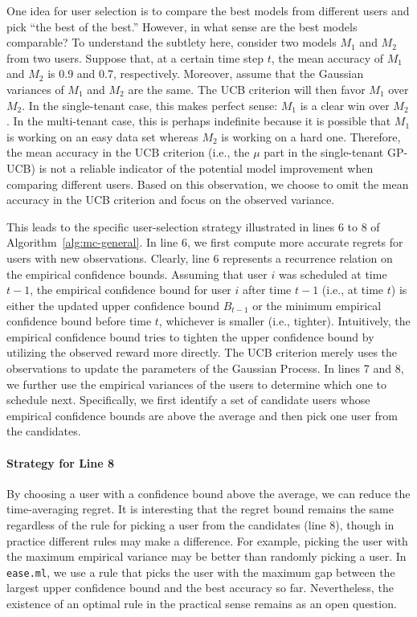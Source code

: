 \documentclass[letterpaper]{vldb}
\newcommand{\eml}{\texttt{ease.ml}\xspace}
\begin{document}
One idea for user selection is to compare the best models from different users and pick ``the best of the best.''
However, in what sense are the best models comparable?
To understand the subtlety here, consider two models $M_1$ and $M_2$ from two users.
Suppose that, at a certain time step $t$, the mean accuracy of $M_1$ and $M_2$ is 0.9 and 0.7, respectively.
Moreover, assume that the Gaussian variances of $M_1$ and $M_2$ are the same.
The UCB criterion will then favor $M_1$ over $M_2$.
In the single-tenant case, this makes perfect sense: $M_1$ is a clear win over $M_2$.
In the multi-tenant case, this is perhaps indefinite because it is possible that $M_1$ is working on an easy data set whereas $M_2$ is working on a hard one.
Therefore, the mean accuracy in the UCB criterion (i.e., the $\mu$ part in the single-tenant GP-UCB) is not a reliable indicator of the potential model improvement when comparing different users.
Based on this observation, we choose to omit the mean accuracy in the UCB criterion and focus on the observed variance.

This leads to the specific user-selection strategy illustrated in lines 6 to 8 of Algorithm~\ref{alg:mc-general}.
In line 6, we first compute more accurate regrets for users with new observations.
Clearly, line 6 represents a recurrence relation on the empirical confidence bounds.
Assuming that user $i$ was scheduled at time $t-1$, the empirical confidence bound for user $i$ after time $t-1$ (i.e., at time $t$) is either the updated upper confidence bound $B_{t-1}$
or the minimum empirical confidence bound before time $t$, whichever is smaller (i.e., tighter).
Intuitively, the empirical confidence bound tries to tighten the upper confidence bound by utilizing the observed reward more directly. The UCB criterion merely uses the observations to update the parameters of the Gaussian Process.
In lines 7 and 8, we further use the empirical variances of the users to determine which one to schedule next.
Specifically, we first identify a set of candidate users whose empirical confidence bounds are above the average and then pick one user from the candidates.

\paragraph*{Strategy for Line 8}
By choosing a user with a confidence bound above the average, we can reduce the time-averaging regret.
It is interesting that the regret bound remains the same regardless of the rule for picking a user from the candidates (line 8), though in practice different rules may make a difference.
For example, picking the user with the maximum empirical variance may be better than randomly picking a user. In \eml, we 
use a rule that picks the user with the maximum
gap between the largest upper confidence bound
and the best accuracy so far.
Nevertheless, the existence of an optimal rule in the practical sense remains as an open question.
\end{document}
